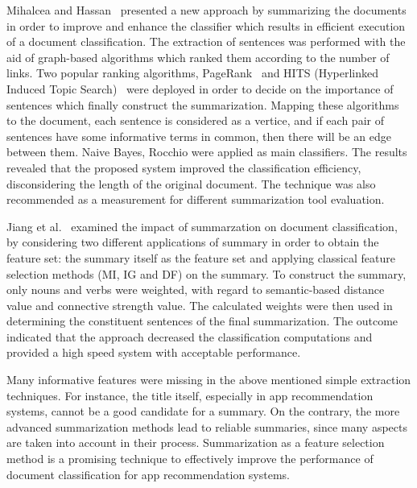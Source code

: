 \documentclass{sigchi}
\begin{document}
Mihalcea and Hassan~\cite{mihalcea2005using} presented a new approach by summarizing the documents in order to improve and enhance the classifier which results in efficient execution of a document classification.
The extraction of sentences was performed with the aid of graph-based algorithms which ranked them according to the number of links. 
Two popular ranking algorithms, PageRank~\cite{Brin20123825} and HITS (Hyperlinked Induced Topic Search)~\cite{Kleinberg:1999:ASH:324133.324140} were deployed in order to decide on the importance of sentences which finally construct the summarization. 
Mapping these algorithms to the document, each sentence is considered as a vertice, and if each pair of sentences have some informative terms in common, then there will be an edge between them. 
Naive Bayes, Rocchio were applied as main classifiers. 
The results revealed that the proposed system improved the classification efficiency, disconsidering the length of the original document. 
The technique was also recommended as a measurement for different summarization tool evaluation.

Jiang et al.~\cite{4797414} examined the impact of summarzation on document classification, by considering two different applications of summary in order to obtain the feature set: the summary itself as the feature set and applying classical feature selection methods (MI, IG and DF) on the summary. 
To construct the summary, only nouns and verbs were weighted, with regard to semantic-based distance value and connective strength value. 
The calculated weights were then used in determining the constituent sentences of the final summarization. 
The outcome indicated that the approach decreased the classification computations and provided a high speed system with acceptable performance.

Many informative features were missing in the above mentioned simple extraction techniques. 
For instance, the title itself, especially in app recommendation systems, cannot be a good candidate for a summary. 
On the contrary, the more advanced summarization methods lead to reliable summaries, since many aspects are taken into account in their process.
Summarization as a feature selection method is a promising technique to effectively improve the performance of document classification for app recommendation systems.
\end{document}
